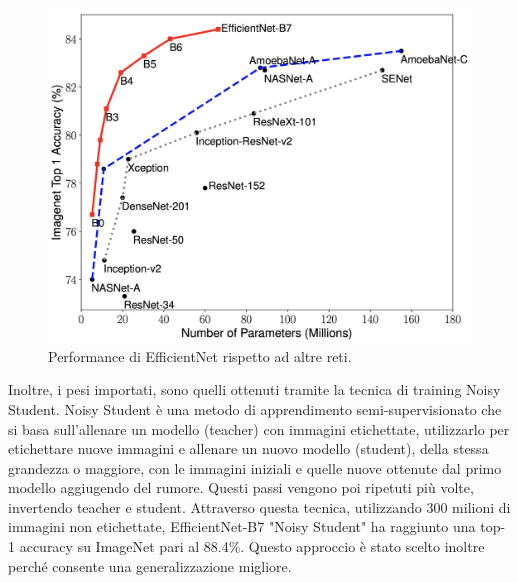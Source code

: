         \begin{figure}[H]
            \centering
            \includegraphics[scale=0.15]{Plot/efficientnet.png}
            \caption{Performance di EfficientNet rispetto ad altre reti.}
            \label{fig:efficientnet}
        \end{figure}
        
        Inoltre, i pesi importati, sono quelli ottenuti tramite la tecnica di training Noisy Student. Noisy Student è una metodo di apprendimento semi-supervisionato che si basa sull'allenare un modello (teacher) con immagini etichettate, utilizzarlo per etichettare nuove immagini e allenare un nuovo modello (student), della stessa grandezza o maggiore, con le immagini iniziali e quelle nuove ottenute dal primo modello aggiugendo del rumore. Questi passi vengono poi ripetuti più volte, invertendo teacher e student. Attraverso questa tecnica, utilizzando 300 milioni di immagini non etichettate, EfficientNet-B7 "Noisy Student" ha raggiunto una top-1 accuracy su ImageNet pari al 88.4\%. Questo approccio è stato scelto inoltre perché consente una generalizzazione migliore. \cite{xie2020selftraining}

